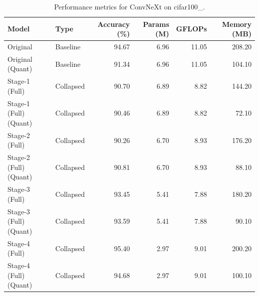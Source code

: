 \begin{table}
\caption{Performance metrics for ConvNeXt on cifar100_.}
\label{tab:ConvNeXt_cifar100_}
\begin{tabular}{llrrrr}
\toprule
Model & Type & Accuracy (\%) & Params (M) & GFLOPs & Memory (MB) \\
\midrule
Original & Baseline & 94.67 & 6.96 & 11.05 & 208.20 \\
Original
(Quant) & Baseline & 91.34 & 6.96 & 11.05 & 104.10 \\
Stage-1 (Full) & Collapsed & 90.70 & 6.89 & 8.82 & 144.20 \\
Stage-1 (Full)
(Quant) & Collapsed & 90.46 & 6.89 & 8.82 & 72.10 \\
Stage-2 (Full) & Collapsed & 90.26 & 6.70 & 8.93 & 176.20 \\
Stage-2 (Full)
(Quant) & Collapsed & 90.81 & 6.70 & 8.93 & 88.10 \\
Stage-3 (Full) & Collapsed & 93.45 & 5.41 & 7.88 & 180.20 \\
Stage-3 (Full)
(Quant) & Collapsed & 93.59 & 5.41 & 7.88 & 90.10 \\
Stage-4 (Full) & Collapsed & 95.40 & 2.97 & 9.01 & 200.20 \\
Stage-4 (Full)
(Quant) & Collapsed & 94.68 & 2.97 & 9.01 & 100.10 \\
\bottomrule
\end{tabular}
\end{table}
